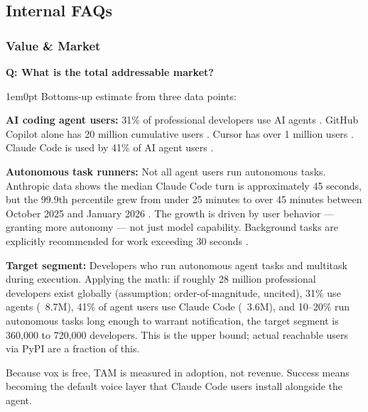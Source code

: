 \documentclass[11pt,letterpaper]{article}
\newcounter{faqnum}
\newenvironment{faqpair}[1]{%
  \needspace{4\baselineskip}%
  \vspace{0.5em}%
  \refstepcounter{faqnum}%
  \noindent\textbf{\color{SectionBlue}Q\thefaqnum: #1}\par\nopagebreak[4]%
  \vspace{0.2em}%
  \begin{adjustwidth}{1em}{0pt}%
  \setlength{\parindent}{0pt}%
}{%
  \end{adjustwidth}%
  \vspace{0.5em}%
}
\begin{document}

\newpage
\subsection*{Internal FAQs}

\subsubsection*{Value \& Market}

\begin{faqpair}{What is the total addressable market?}\label{faq:tam}
  Bottoms-up estimate from three data points:

  \textbf{AI coding agent users:} 31\% of professional developers use AI
  agents \cite{stackoverflow2025survey}. GitHub Copilot alone has 20 million
  cumulative users \cite{techcrunch2025copilot20m}. Cursor has over 1 million
  users \cite{opsera2025cursor}. Claude Code is used by 41\% of AI agent users
  \cite{stackoverflow2025survey}.

  \textbf{Autonomous task runners:} Not all agent users run autonomous tasks.
  Anthropic data shows the median Claude Code turn is approximately 45 seconds,
  but the 99.9th percentile grew from under 25 minutes to over 45 minutes
  between October 2025 and January 2026 \cite{anthropic2026agentautonomy}. The
  growth is driven by user behavior --- granting more autonomy --- not just
  model capability. Background tasks are explicitly recommended for work
  exceeding 30 seconds \cite{venturebeat2025claudetasks}.

  \textbf{Target segment:} Developers who run autonomous agent tasks and
  multitask during execution. Applying the math: if roughly 28 million
  professional developers exist globally (assumption; order-of-magnitude,
  uncited), 31\% use agents (~8.7M), 41\%
  of agent users use Claude Code (~3.6M), and 10--20\% run autonomous tasks
  long enough to warrant notification, the target segment is 360{,}000 to
  720{,}000 developers. This is the upper bound; actual reachable users via
  PyPI are a fraction of this.

  Because vox is free, TAM is measured in adoption, not revenue. Success
  means becoming the default voice layer that Claude Code users install
  alongside the agent.
\end{faqpair}
\end{document}
